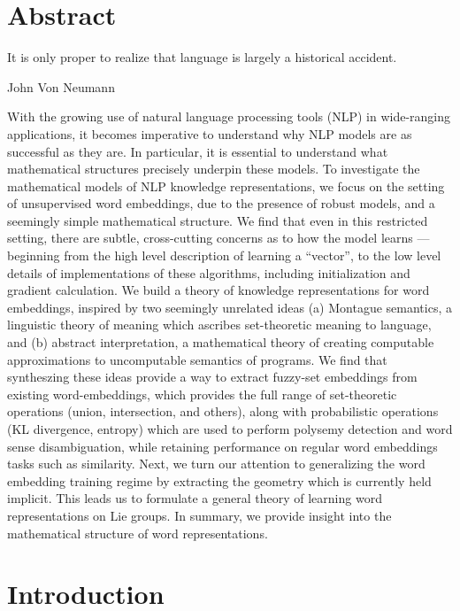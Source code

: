 \documentclass[11pt]{book}
\begin{document}
\chapter*{Abstract}
\label{ch:abstract}
\epigraph{It is only proper to realize that language is largely a historical accident.}{John Von Neumann}

With the growing use of natural language processing tools (NLP) in
wide-ranging applications, it becomes imperative to understand why NLP models
are as successful as they are. In particular, it is essential to understand
what mathematical structures precisely underpin these models. To investigate
the mathematical models of NLP knowledge representations, we focus on the
setting of unsupervised word embeddings, due to the presence of robust models,
and a seemingly simple mathematical structure. We find that even in this
restricted setting, there are subtle, cross-cutting concerns as to how the
model learns --- beginning from the high level description of learning a
``vector'', to the low level details of implementations of these algorithms,
including initialization and gradient calculation. We build a theory of
knowledge representations for word embeddings, inspired by two seemingly
unrelated ideas (a) Montague semantics, a linguistic theory of meaning which
ascribes set-theoretic meaning to language, and (b) abstract interpretation, a
mathematical theory of creating computable approximations to uncomputable
semantics of programs. We find that syntheszing these ideas provide a way to
extract fuzzy-set embeddings from existing word-embeddings, which provides the
full range of set-theoretic operations (union, intersection, and others), along
with probabilistic operations (KL divergence, entropy) which are used to
perform polysemy detection and word sense disambiguation, while retaining
performance on regular word embeddings tasks such as similarity. Next, we turn
our attention to generalizing the word embedding training regime by extracting
the geometry which is currently held implicit. This leads us to formulate a
general theory of learning word representations on Lie groups. In summary, we
provide insight into the mathematical structure of word representations.



\tableofcontents
\listoffigures
\listoftables

\chapter{Introduction}
\end{document}

